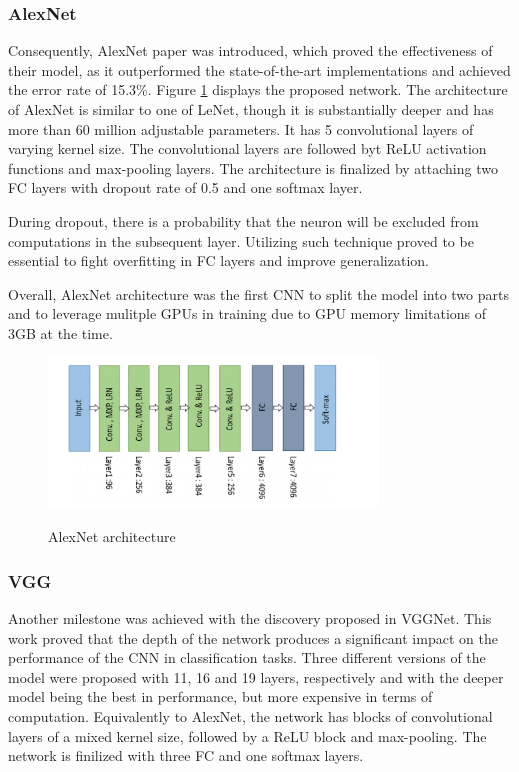\documentclass[english, 12pt, a4paper, elec, utf8, a-1b, online]{aaltothesis}
\begin{document}
\subsubsection{AlexNet}
Consequently, AlexNet paper was introduced, which proved the effectiveness of their model, as it outperformed the state-of-the-art implementations and achieved the error rate of 15.3\%. \cite{NIPS2012_c399862d} Figure \ref{AlexNet} displays the proposed network. The architecture of AlexNet is similar to one of LeNet, though it is substantially deeper and has more than 60 million adjustable parameters. It has 5 convolutional layers of varying kernel size. The convolutional layers are followed byt ReLU activation functions and max-pooling layers. The architecture is finalized by attaching two FC layers with dropout rate of 0.5 and one softmax layer.

During dropout, there is a probability that the neuron will be excluded from computations in the subsequent layer. Utilizing such technique proved to be essential to fight overfitting in FC layers and improve generalization. \cite{JMLR:v15:srivastava14a} 

Overall, AlexNet architecture was the first CNN to split the model into two parts and to leverage mulitple GPUs in training due to GPU memory limitations of 3GB at the time. 

\begin{figure}[htb]
	\begin{center}
		\includegraphics[height=4cm]{./AlexNet.png}
	\end{center}
	\caption{AlexNet architecture \cite{alom01}}
	\begin{center}
		\label{AlexNet}
	\end{center}
\end{figure}
\FloatBarrier

\subsubsection{VGG}
Another milestone was achieved with the discovery proposed in VGGNet\cite{Simonyan2014}. This work proved that the depth of the network produces a significant impact on the performance of the CNN in classification tasks.\cite{alom01} Three different versions of the model were proposed with 11, 16 and 19 layers, respectively and with the deeper model being the best in performance, but more expensive in terms of computation. Equivalently to AlexNet, the network has blocks of convolutional layers of a mixed kernel size, followed by a ReLU block and max-pooling. The network is finilized with three FC and one softmax layers. 
\end{document}
